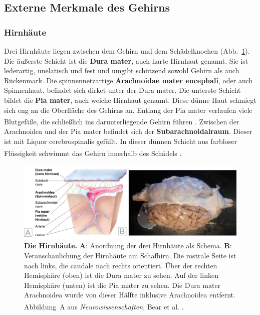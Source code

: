 \subsection{Externe Merkmale des Gehirns}
\label{subsec:Externe_Merkmale}

\subsubsection{Hirnhäute} 

Drei Hirnhäute liegen zwischen dem Gehirn und dem Schädelknochen (Abb.~\ref{fig:hirnhaeute}). Die äußerste Schicht ist die \textbf{Dura mater}, auch harte Hirnhaut genannt. Sie ist lederartig, unelatisch und fest und umgibt schützend sowohl Gehirn als auch Rückenmark. Die spinnennetzartige \textbf{Arachnoidae mater encephali}, oder auch Spinnenhaut, befindet sich dirket unter der Dura mater. Die unterste Schicht bildet die \textbf{Pia mater}, auch weiche Hirnhaut genannt. Diese dünne Haut schmiegt sich eng an die Oberfläche des Gehirns an. Entlang der Pia mater verlaufen viele Blutgefäße, die schließlich ins darunterliegende Gehirn führen \textsuperscript{\cite[Kap.~7]{neurowissenschaften_baer}}. Zwischen der Arachnoidea und der Pia mater befindet sich der \textbf{Subarachnoidalraum}. Dieser ist mit Liquor cerebrospinalis gefüllt. In dieser dünnen Schicht aus farbloser Flüssigkeit schwimmt das Gehirn innerhalb des Schädels \textsuperscript{\cite[Kap.~7]{neurowissenschaften_baer}}.

\begin{figure}[H]
	\centering
	\includegraphics[width=\textwidth]{pictures/Bilder_Jule/Andere/hirnhaeute2.png}
	\caption[Die Hirnhäute]{\textbf{Die Hirnhäute.} \textbf{A}: Anordnung der drei Hirnhäute als Schema. \textbf{B}: Veranschaulichung der Hirnhäute am Schafhirn. Die  rostrale Seite ist nach links, die caudale nach rechts orientiert. Über der rechten Hemisphäre (oben) ist die Dura mater zu sehen. Auf der linken Hemisphäre (unten) ist die Pia mater zu sehen. Die Dura mater Arachnoidea wurde von dieser Hälfte inklusive Arachnoidea entfernt.\\
	Abbildung~A aus \textit{Neurowissenschaften}, Bear et al. \textsuperscript{\cite[Kap.~7]{neurowissenschaften_baer}}.}
	\label{fig:hirnhaeute}
\end{figure}


